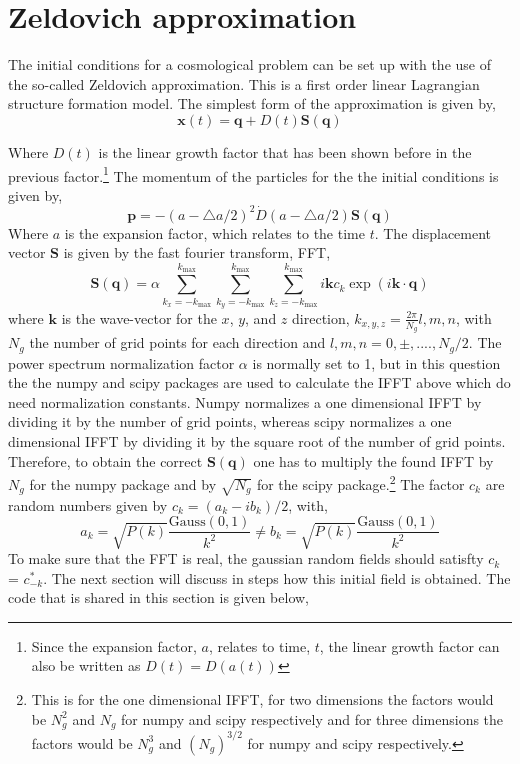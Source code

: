 \newpage
\section{Zeldovich approximation}
The initial conditions for a cosmological problem can be set up with the use of the so-called Zeldovich approximation. This is a first order linear Lagrangian structure formation model. The simplest form of the approximation is given by,
\begin{equation*}
\textbf{x}(t) = \textbf{q} + D(t)\textbf{S}(\textbf{q})
\end{equation*}

Where $D(t)$ is the linear growth factor that has been shown before in the previous factor.\footnote{Since the expansion factor, $a$, relates to time, $t$, the linear growth factor can also be written as $D(t) = D(a(t))$} The momentum of the particles for the the initial conditions is given by,
\begin{equation*}
\textbf{p} = -(a-\triangle a/2)^2\dot{D}(a-\triangle a/2)\textbf{S}(\textbf{q})
\end{equation*}
Where $a$ is the expansion factor, which relates to the time $t$. The displacement vector $\textbf{S}$ is given by the fast fourier transform, FFT,
\begin{equation*}
\textbf{S}(\textbf{q}) = \alpha \sum_{k_x = - k_{\mathrm{max}}}^{k_{\mathrm{max}}} \sum_{k_y = - k_{\mathrm{max}}}^{k_{\mathrm{max}}}\sum_{k_z = - k_{\mathrm{max}}}^{k_{\mathrm{max}}} i\textbf{k}c_k \exp(i\textbf{k}\cdot\textbf{q})
\end{equation*}
where $\textbf{k}$ is the wave-vector for the $x$, $y$, and $z$ direction, $k_{x,y,z} = \frac{2\pi}{N_g}l,m,n$, with $N_g$ the number of grid points for each direction and $l,m,n = 0,\pm,....,N_g/2$. The power spectrum normalization factor $\alpha$ is normally set to 1, but in this question the the numpy and scipy packages are used to calculate the IFFT above which do need normalization constants. Numpy normalizes a one dimensional IFFT by dividing it by the number of grid points, whereas scipy normalizes a one dimensional IFFT by dividing it by the square root of the number of grid points. Therefore, to obtain the correct $\textbf{S}(\textbf{q})$ one has to multiply the found IFFT by $N_g$ for the numpy package and by $\sqrt{N_g}$ for the scipy package.\footnote{This is for the one dimensional IFFT, for two dimensions the factors would be $N_g^2$ and $N_g$ for numpy and scipy respectively and for three dimensions the factors would be $N_g^3$ and $(N_g)^{3/2}$ for numpy and scipy respectively.} The factor $c_k$ are random numbers given by $c_k = (a_k - ib_k)/2$, with,
\begin{equation*}
a_k = \sqrt{P(k)}\frac{\mathrm{Gauss}(0,1)}{k^2}\neq b_k = \sqrt{P(k)}\frac{\mathrm{Gauss}(0,1)}{k^2}
\end{equation*}
To make sure that the FFT is real, the gaussian random fields should satisfty $c_k$ = $c_{-k}^*$. The next section will discuss in steps how this initial field is obtained. The code that is shared in this section is given below,

